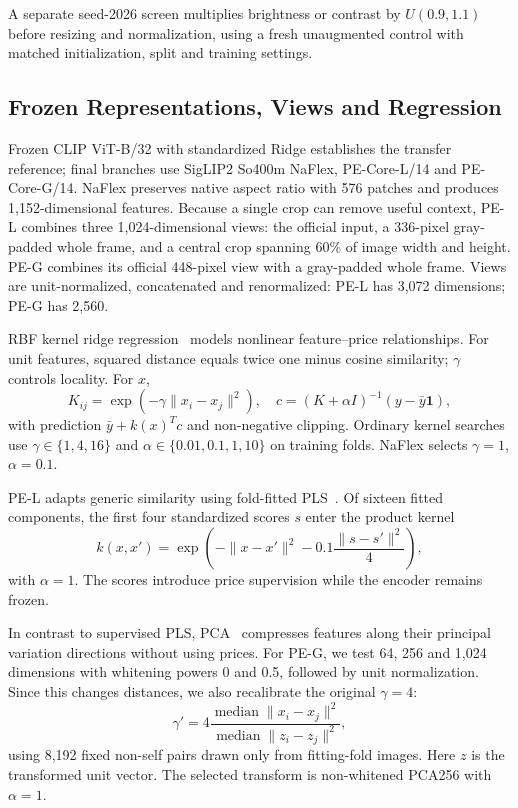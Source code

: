 \documentclass[conference,a4paper]{IEEEtran}
\begin{document}
A separate seed-2026 screen multiplies brightness or contrast by $U(0.9,1.1)$ before resizing and normalization, using a fresh unaugmented control with matched initialization, split and training settings.

\subsection{Frozen Representations, Views and Regression}
Frozen CLIP ViT-B/32 with standardized Ridge establishes the transfer reference; final branches use SigLIP2 So400m NaFlex, PE-Core-L/14 and PE-Core-G/14. NaFlex preserves native aspect ratio with 576 patches and produces 1,152-dimensional features. Because a single crop can remove useful context, PE-L combines three 1,024-dimensional views: the official input, a 336-pixel gray-padded whole frame, and a central crop spanning 60\% of image width and height. PE-G combines its official 448-pixel view with a gray-padded whole frame. Views are unit-normalized, concatenated and renormalized: PE-L has 3,072 dimensions; PE-G has 2,560.

RBF kernel ridge regression~\cite{krr} models nonlinear feature--price relationships. For unit features, squared distance equals twice one minus cosine similarity; $\gamma$ controls locality. For $x$,
\begin{equation}
 K_{ij}=\exp(-\gamma\|x_i-x_j\|^2),\quad
 c=(K+\alpha I)^{-1}(y-\bar y\mathbf{1}),
\end{equation}
with prediction $\bar y+k(x)^Tc$ and non-negative clipping. Ordinary kernel searches use $\gamma\in\{1,4,16\}$ and $\alpha\in\{0.01,0.1,1,10\}$ on training folds. NaFlex selects $\gamma=1$, $\alpha=0.1$.

PE-L adapts generic similarity using fold-fitted PLS~\cite{pls1966,pls}. Of sixteen fitted components, the first four standardized scores $s$ enter the product kernel
\begin{equation}
 k(x,x')=\exp\left(-\|x-x'\|^2-0.1\frac{\|s-s'\|^2}{4}\right),
\end{equation}
with $\alpha=1$. The scores introduce price supervision while the encoder remains frozen.

In contrast to supervised PLS, PCA~\cite{pca} compresses features along their principal variation directions without using prices. For PE-G, we test 64, 256 and 1,024 dimensions with whitening powers 0 and 0.5, followed by unit normalization. Since this changes distances, we also recalibrate the original $\gamma=4$:
\begin{equation}
 \gamma'=4\frac{\operatorname{median}\|x_i-x_j\|^2}
 {\operatorname{median}\|z_i-z_j\|^2},
\end{equation}
using 8,192 fixed non-self pairs drawn only from fitting-fold images. Here $z$ is the transformed unit vector. The selected transform is non-whitened PCA256 with $\alpha=1$.
\end{document}
